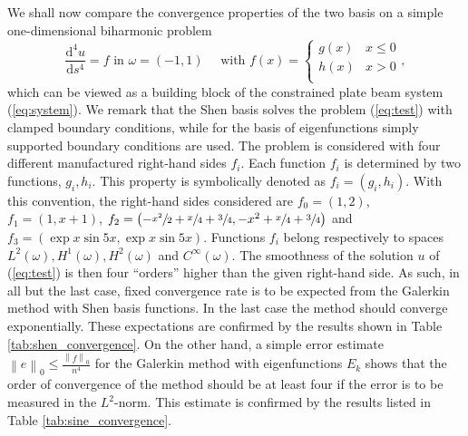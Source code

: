 \documentclass{marine_2015}
\newcommand{\inner}[2]{\ensuremath{\left(#1, #2\right)}}
\newcommand{\norm}[1]{\ensuremath{\left\|#1\right\|}}
\newcommand{\deriv}[2]{\ensuremath{\frac{\mathrm{d}#1}{\mathrm{d}#2}}}
\begin{document}
We shall now compare the convergence properties of the two basis on a simple 
one-dimensional biharmonic problem
\begin{equation}
  \label{eq:test}
  \deriv{^4u}{s^4} = f\text{ in }\omega=\left(-1, 1 \right)\quad\text{ with }f(x)=\begin{cases}
      g(x) & x \leq 0 \\
      h(x) & x > 0 \\
    \end{cases},
  \end{equation}
which can be viewed as a building block of the constrained plate beam system
(\ref{eq:system}). We remark that the Shen basis solves the problem (\ref{eq:test}) with clamped
boundary conditions, while for the basis of eigenfunctions simply supported
boundary conditions are used. The problem is considered with four different
manufactured right-hand sides $f_i$. Each function $f_i$ is determined by two 
functions, $g_i, h_i$. This property is symbolically denoted as $f_i=\left(g_i, h_i\right)$. 
With this convention, the right-hand sides considered are $f_0=\inner{1}{2}$, 
$f_1=\inner{1}{x+1}$,
$f_2=\inner{-\sfrac{x^2}{2} + \sfrac{x}{4} + \sfrac{3}{4}}{-x^2 +
\sfrac{x}{4} + \sfrac{3}{4}}$ and
$f_3=\inner{\exp{x}\sin{5x}}{\exp{x}\sin{5x}}$. Functions $f_i$ belong
respectively to spaces $L^2\left(\omega\right), H^1\left(\omega\right), 
H^2\left(\omega\right)$ and $C^{\infty}\left(\omega\right)$. The smoothness of the
solution $u$ of (\ref{eq:test}) is then four ``orders'' higher than the given
right-hand side. As such, in all but the last case, fixed convergence rate is to 
be expected from the Galerkin method with Shen basis functions. In the last case
the method should converge exponentially. These expectations are confirmed by
the results shown in Table \ref{tab:shen_convergence}. On the other hand, a simple 
error estimate $\norm{e}_0\leq\tfrac{\norm{f}_0}{n^4}$ for the Galerkin method 
with eigenfunctions $E_k$ shows that the order of convergence of the method
should be at least four if the error is to be measured in the $L^2$-norm. This 
estimate is confirmed by the results listed in Table \ref{tab:sine_convergence}.
\end{document}
